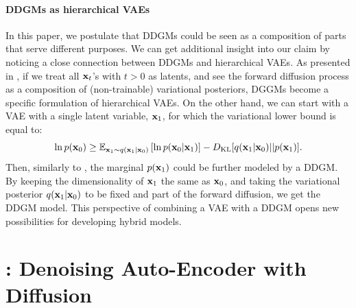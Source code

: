 \paragraph{DDGMs as hierarchical VAEs} In this paper, we postulate that DDGMs could be seen as a composition of parts that serve different purposes. We can get additional insight into our claim by noticing a close connection between DDGMs and hierarchical VAEs. As presented in \citet{huang2021variational,kingma2021variational}, if we treat all ${\mathbf{x}}_t$'s with $t>0$ as latents, and see the forward diffusion process as a composition of (non-trainable) variational posteriors, DGGMs become a specific formulation of hierarchical VAEs. On the other hand, we can start with a VAE with a single latent variable, ${\mathbf{x}}_1$, for which the variational lower bound is equal to:
\begin{equation}
    \ln p({\mathbf{x}}_0) \geq \mathbb{E}_{{\mathbf{x}}_1 \sim q({\mathbf{x}}_1 | {\mathbf{x}}_0)}\left[\ln p({\mathbf{x}}_0|{\mathbf{x}}_1)\right] - D_{\text{KL}}[q({\mathbf{x}}_1 | {\mathbf{x}}_0)||p({\mathbf{x}}_1)].
\end{equation}
Then, similarly to \citet{vahdat2021score,wehenkel2021diffusion}, the marginal $p({\mathbf{x}}_1)$ could be further modeled by a DDGM. By keeping the dimensionality of ${\mathbf{x}}_1$ the same as ${\mathbf{x}}_0$, and taking the variational posterior $q({\mathbf{x}}_1 | {\mathbf{x}}_0)$ to be fixed and part of the forward diffusion, we get the DDGM model. This perspective of combining a VAE with a DDGM opens new possibilities for developing hybrid models.

\section{\ours{}: Denoising Auto-Encoder with Diffusion}

